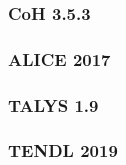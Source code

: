 \subsubsection{CoH 3.5.3}
\subsubsection{ALICE 2017}
\subsubsection{TALYS 1.9}
\subsubsection{TENDL 2019}








